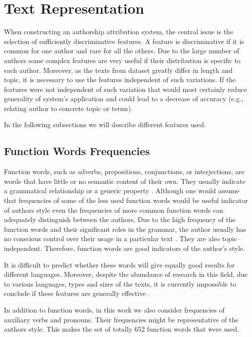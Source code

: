 \documentclass{llncs}
\begin{document}
\section{Text Representation}
When constructing an authorship attribution system, the central issue is the
selection of sufficiently discriminative features. A feature is discriminative if
it is common for one author and rare for all the others. Due to the large number
of authors some complex features are very useful if their distribution is
specific to each author. Moreover, as the texts from dataset greatly differ in
length and topic, it is necessary to use the features independent of such
variations. If the features were not independent of such variation that
would most certainly reduce generality of system's application and could lead
to a decrease of accuracy (e.g., relating author to concrete topic or terms).

In the following subsections we will describe different features used.

\subsection{Function Words Frequencies}
\label{sec:funkcijske-rijeci}
Function words, such as adverbs, prepositions, conjunctions, or interjections,
are words that have little or no semantic content of their own. They usually
indicate a grammatical relationship or a generic property
\cite{zhao2005effective}. Although one would assume that frequencies of some of
the less used function words would be useful indicator of authors style even the
frequencies of more common function words can adequately distinguish between the
authors. Due to the high frequency of the function words and their significant
roles in the grammar, the author usually has no conscious control over their
usage in a particular text \cite{argamon2005measuring}. They are also
topic--independent. Therefore, function words are good indicators of the author's
style.

It is difficult to predict whether these words will give equally good results for
different languages. Moreover, despite the abundance of research in this field,
due to various languages, types and sizes of the texts, it is currently
impossible to conclude if these features are generally effective
\cite{zhao2005effective}.

In addition to function words, in this work we also consider frequencies of
auxiliary verbs and pronouns. Their frequencies might be
representative of the authors style. This makes the set of totally
652 function words that were used.
\end{document}
